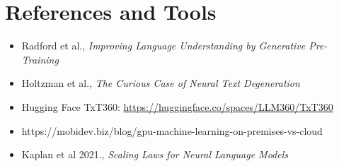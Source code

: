 \documentclass[11pt]{article}
\begin{document}
\section*{References and Tools}
\begin{itemize}
    \item Radford et al., \textit{Improving Language Understanding by Generative Pre-Training}
    \item Holtzman et al., \textit{The Curious Case of Neural Text Degeneration}
    \item Hugging Face TxT360: \url{https://huggingface.co/spaces/LLM360/TxT360}
    \item https://mobidev.biz/blog/gpu-machine-learning-on-premises-vs-cloud
    \item Kaplan et al 2021., \textit{Scaling Laws for Neural Language Models}
\end{itemize}
\end{document}
